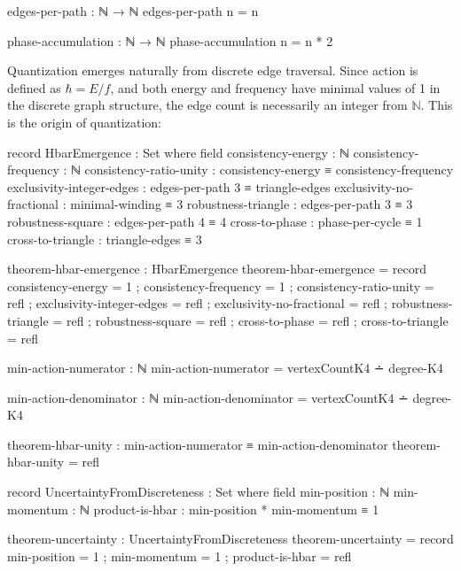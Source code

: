 \documentclass[11pt,a4paper]{book}
\begin{document}
\begin{code}
edges-per-path : ℕ → ℕ
edges-per-path n = n

phase-accumulation : ℕ → ℕ
phase-accumulation n = n * 2
\end{code}

Quantization emerges naturally from discrete edge traversal. Since action is defined 
as $\hbar = E/f$, and both energy and frequency have minimal values of 1 in the discrete 
graph structure, the edge count is necessarily an integer from $\mathbb{N}$. This is the 
origin of quantization:

\begin{code}
record HbarEmergence : Set where
  field
    consistency-energy    : ℕ
    consistency-frequency : ℕ
    consistency-ratio-unity : consistency-energy ≡ consistency-frequency
    exclusivity-integer-edges : edges-per-path 3 ≡ triangle-edges
    exclusivity-no-fractional : minimal-winding ≡ 3
    robustness-triangle : edges-per-path 3 ≡ 3
    robustness-square : edges-per-path 4 ≡ 4
    cross-to-phase : phase-per-cycle ≡ 1
    cross-to-triangle : triangle-edges ≡ 3

theorem-hbar-emergence : HbarEmergence
theorem-hbar-emergence = record
  { consistency-energy = 1
  ; consistency-frequency = 1
  ; consistency-ratio-unity = refl
  ; exclusivity-integer-edges = refl
  ; exclusivity-no-fractional = refl
  ; robustness-triangle = refl
  ; robustness-square = refl
  ; cross-to-phase = refl
  ; cross-to-triangle = refl
  }

min-action-numerator : ℕ
min-action-numerator = vertexCountK4 ∸ degree-K4

min-action-denominator : ℕ  
min-action-denominator = vertexCountK4 ∸ degree-K4

theorem-hbar-unity : min-action-numerator ≡ min-action-denominator
theorem-hbar-unity = refl
\end{code}

\begin{code}
record UncertaintyFromDiscreteness : Set where
  field
    min-position : ℕ
    min-momentum : ℕ
    product-is-hbar : min-position * min-momentum ≡ 1

theorem-uncertainty : UncertaintyFromDiscreteness
theorem-uncertainty = record
  { min-position = 1
  ; min-momentum = 1
  ; product-is-hbar = refl
  }
\end{code}
\end{document}
